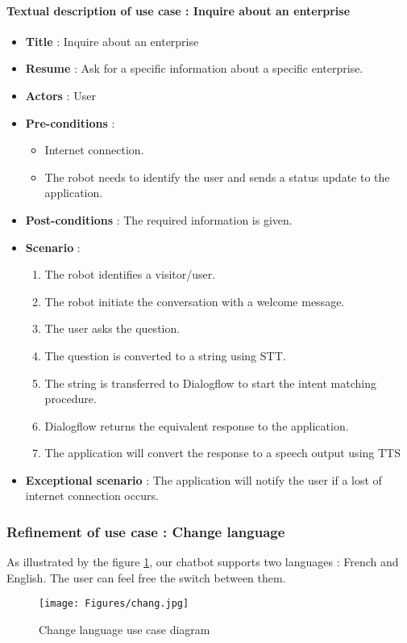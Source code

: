 \paragraph{Textual description of use case : Inquire about an enterprise}
\begin{itemize}
    \item \textbf{Title} : Inquire about an enterprise
    \item \textbf{Resume} : Ask for a specific information about a specific enterprise.
    \item \textbf{Actors} : User
    \item \textbf{Pre-conditions} : \begin{itemize}
        \item Internet connection.
        \item The robot needs to identify the user and sends a status update to the application. 
    \end{itemize}    
    \item \textbf{Post-conditions} : The required information is given.
    \item \textbf{Scenario} : \begin{enumerate}
        \item The robot identifies a visitor/user.
        \item The robot initiate the conversation with a welcome message.
        \item The user asks the question.
        \item The question is converted to a string using STT. 
        \item The string is transferred to Dialogflow to start the intent matching procedure.
        \item Dialogflow returns the equivalent response to the application.
        \item The application will convert the response to a speech output using TTS
    \end{enumerate}
    \item \textbf{Exceptional scenario} : The application will notify the user if a lost of internet connection occurs.
\end{itemize}
\subsubsection{Refinement of use case : Change language}
As illustrated by the figure \ref{fig:use case change language}, our chatbot supports two languages : French and English. The user can feel free the switch between them.
\begin{figure}[H]
\centering
\texttt{[image: Figures/chang.jpg]}
\caption{Change language use case diagram}
\label{fig:use case change language}
\end{figure}
